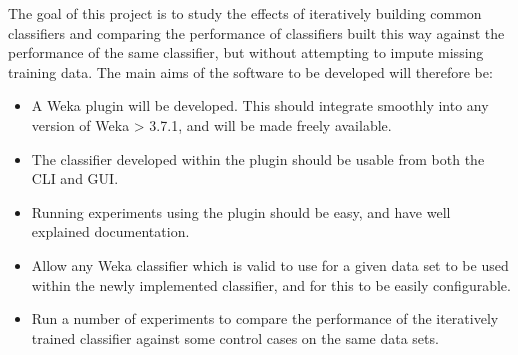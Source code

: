 
The goal of this project is to study the effects of iteratively building common classifiers and comparing the performance of classifiers built this way against the performance of the same classifier, but without attempting to impute missing training data. The main aims of the software to be developed will therefore be:

\begin{itemize}
\item A Weka plugin will be developed. This should integrate smoothly into any version of Weka > 3.7.1, and will be made freely available.
\item The classifier developed within the plugin should be usable from both the CLI and GUI.
\item Running experiments using the plugin should be easy, and have well explained documentation.
\item Allow any Weka classifier which is valid to use for a given data set to be used within the newly implemented classifier, and for this to be easily configurable.
\item Run a number of experiments to compare the performance of the iteratively trained classifier against some control cases on the same data sets.
\end{itemize}
